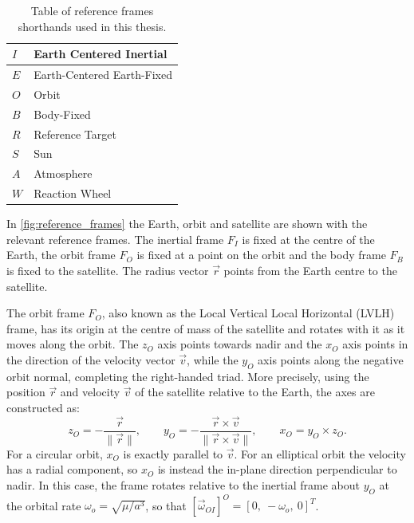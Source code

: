 \vspace{1cm}

\begingroup
\begin{table}[H]
    \centering
    \begin{tabular}{@{}p{2.5cm} l}
        \hline
        $I$ & Earth Centered Inertial \\
        \hline
        $E$ & Earth-Centered Earth-Fixed \\
        \hline
        $O$ & Orbit  \\
        \hline
        $B$ & Body-Fixed \\
        \hline
        $R$ & Reference Target \\
        \hline
        $S$ & Sun \\
        \hline
        $A$ & Atmosphere \\
        \hline
        $W$ & Reaction Wheel \\
        \hline
    \end{tabular}
\caption{Table of reference frames shorthands used in this thesis.}
\end{table}
\endgroup

\vspace{1cm}


In \autoref{fig:reference_frames} the Earth, orbit and satellite are shown with the relevant reference frames. The inertial frame $F_I$ is fixed at the centre of the Earth, the orbit frame $F_O$ is fixed at a point on the orbit and the body frame $F_B$ is fixed to the satellite. The radius vector $\vec{r}$ points from the Earth centre to the satellite.

The orbit frame $F_O$, also known as the Local Vertical Local Horizontal (LVLH) frame, has its origin at the centre of mass of the satellite and rotates with it as it moves along the orbit. The $z_O$ axis points towards nadir and the $x_O$ axis points in the direction of the velocity vector $\vec{v}$, while the $y_O$ axis points along the negative orbit normal, completing the right-handed triad. More precisely, using the position $\vec{r}$ and velocity $\vec{v}$ of the satellite relative to the Earth, the axes are constructed as:
\begin{equation}
    z_O = -\frac{\vec{r}}{\lVert\vec{r}\rVert}, \qquad
    y_O = -\frac{\vec{r}\times\vec{v}}{\lVert\vec{r}\times\vec{v}\rVert}, \qquad
    x_O = y_O \times z_O.
\end{equation}
For a circular orbit, $x_O$ is exactly parallel to $\vec{v}$. For an elliptical orbit the velocity has a radial component, so $x_O$ is instead the in-plane direction perpendicular to nadir. In this case, the frame rotates relative to the inertial frame about $y_O$ at the orbital rate $\omega_o = \sqrt{\mu/a^3}$, so that $[\vec{\omega}_{OI}]^O = [0,\ -\omega_o,\ 0]^T$.


